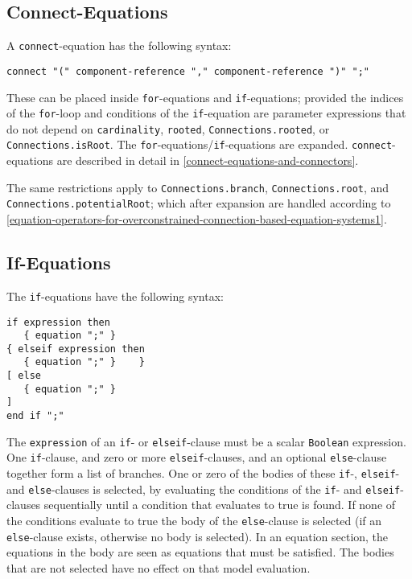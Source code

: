 \subsection{Connect-Equations}\label{connect-equations}

A \lstinline!connect!-equation has the following syntax:
\begin{lstlisting}[language=grammar]
connect "(" component-reference "," component-reference ")" ";"
\end{lstlisting}

These can be placed inside \lstinline!for!-equations and \lstinline!if!-equations; provided the indices of the \lstinline!for!-loop and conditions of the \lstinline!if!-equation are parameter expressions that do not depend on \lstinline!cardinality!, \lstinline!rooted!, \lstinline!Connections.rooted!, or \lstinline!Connections.isRoot!.
The \lstinline!for!-equations/\lstinline!if!-equations are expanded.
\lstinline!connect!-equations are described in detail in \cref{connect-equations-and-connectors}.

The same restrictions apply to \lstinline!Connections.branch!, \lstinline!Connections.root!, and \lstinline!Connections.potentialRoot!; which after expansion are handled according to \cref{equation-operators-for-overconstrained-connection-based-equation-systems1}.

\subsection{If-Equations}\label{if-equations}

The \lstinline!if!-equations have the following syntax:
\begin{lstlisting}[language=grammar]
if expression then
   { equation ";" }
{ elseif expression then
   { equation ";" }    }
[ else
   { equation ";" }
]
end if ";"
\end{lstlisting}

The \lstinline!expression! of an \lstinline!if!- or \lstinline!elseif!-clause must be a scalar \lstinline!Boolean! expression.
One \lstinline!if!-clause, and zero or more \lstinline!elseif!-clauses, and an optional \lstinline!else!-clause together form a list of branches.
One or zero of the bodies of these \lstinline!if!-, \lstinline!elseif!- and \lstinline!else!-clauses is selected, by evaluating the conditions of the \lstinline!if!- and \lstinline!elseif!-clauses sequentially until a condition that evaluates to true is found.
If none of the conditions evaluate to true the body of the \lstinline!else!-clause is selected (if an \lstinline!else!-clause exists, otherwise no body is selected).
In an equation section, the equations in the body are seen as equations that must be satisfied.
The bodies that are not selected have no effect on that model evaluation.

